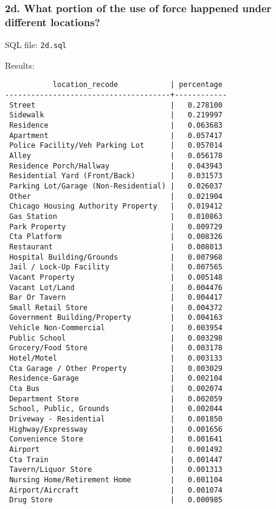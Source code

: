 \documentclass[10pt]{article}
\begin{document}
\subsubsection*{2d. What portion of the use of force happened under different locations?}

SQL file: \texttt{2d.sql}

Results:

\begin{verbatim}
           location_recode            | percentage
--------------------------------------+------------
 Street                               |   0.278100
 Sidewalk                             |   0.219997
 Residence                            |   0.063683
 Apartment                            |   0.057417
 Police Facility/Veh Parking Lot      |   0.057014
 Alley                                |   0.056178
 Residence Porch/Hallway              |   0.043943
 Residential Yard (Front/Back)        |   0.031573
 Parking Lot/Garage (Non-Residential) |   0.026037
 Other                                |   0.021904
 Chicago Housing Authority Property   |   0.019412
 Gas Station                          |   0.010863
 Park Property                        |   0.009729
 Cta Platform                         |   0.008326
 Restaurant                           |   0.008013
 Hospital Building/Grounds            |   0.007968
 Jail / Lock-Up Facility              |   0.007565
 Vacant Property                      |   0.005148
 Vacant Lot/Land                      |   0.004476
 Bar Or Tavern                        |   0.004417
 Small Retail Store                   |   0.004372
 Government Building/Property         |   0.004163
 Vehicle Non-Commercial               |   0.003954
 Public School                        |   0.003298
 Grocery/Food Store                   |   0.003178
 Hotel/Motel                          |   0.003133
 Cta Garage / Other Property          |   0.003029
 Residence-Garage                     |   0.002104
 Cta Bus                              |   0.002074
 Department Store                     |   0.002059
 School, Public, Grounds              |   0.002044
 Driveway - Residential               |   0.001850
 Highway/Expressway                   |   0.001656
 Convenience Store                    |   0.001641
 Airport                              |   0.001492
 Cta Train                            |   0.001447
 Tavern/Liquor Store                  |   0.001313
 Nursing Home/Retirement Home         |   0.001104
 Airport/Aircraft                     |   0.001074
 Drug Store                           |   0.000985

\end{verbatim}
\end{document}
